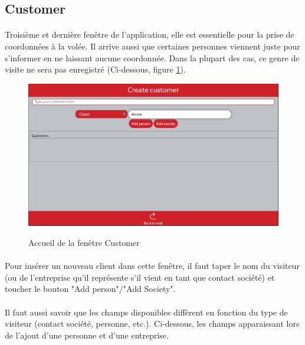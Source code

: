 \documentclass[12pt]{report}
\begin{document}
\subsection*{Customer}
\paragraph{}
Troisième et dernière fenêtre de l'application, elle est essentielle pour la prise de coordonnées à la volée.
Il arrive aussi que certaines personnes viennent juste pour s'informer en ne laissant aucune coordonnée. Dans la plupart des cas, ce genre de visite ne sera pas enregistré (Ci-dessous, figure \ref{image_customer_3}).

\begin{figure}[H]
	\caption{Accueil de la fenêtre Customer}
	\includegraphics[width=\linewidth]{img/image_customer_3}
	\label{image_customer_3}
\end{figure}

\paragraph{}
Pour insérer un nouveau client dans cette fenêtre, il faut taper le nom du visiteur (ou de l'entreprise qu'il représente s'il vient en tant que contact société) et toucher le bouton "Add person"/"Add Society".
\paragraph{}
Il faut aussi savoir que les champs disponibles diffèrent en fonction du type de visiteur (contact société, personne, etc.).
Ci-dessous, les champs apparaissant lors de l'ajout d'une personne et d'une entreprise.
\end{document}
